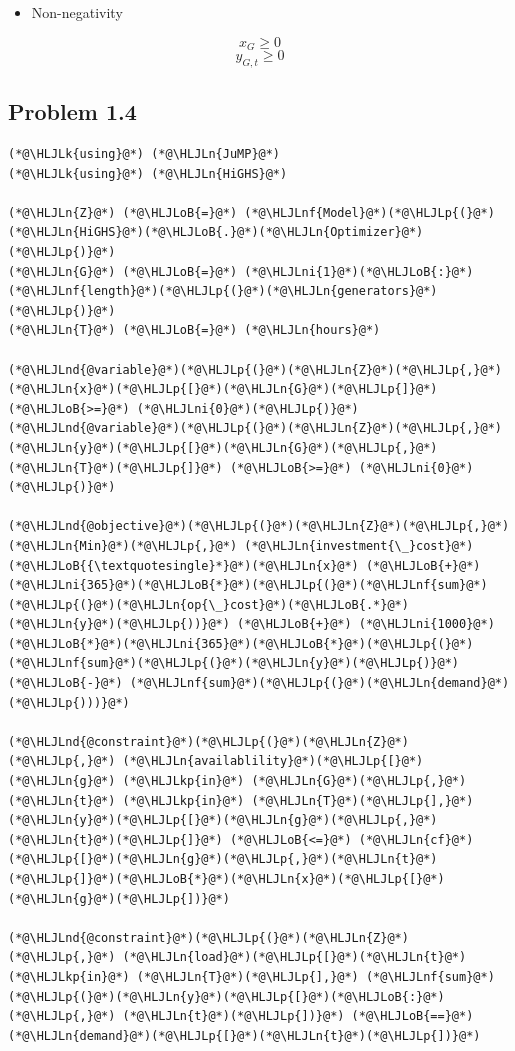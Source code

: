 \documentclass[12pt,a4paper]{article}
\newcommand{\HLJLk}[1]{\textcolor[RGB]{148,91,176}{\textbf{#1}}}
\newcommand{\HLJLkp}[1]{\textcolor[RGB]{148,91,176}{\textbf{#1}}}
\newcommand{\HLJLn}[1]{#1}
\newcommand{\HLJLnd}[1]{\textcolor[RGB]{214,102,97}{#1}}
\newcommand{\HLJLnf}[1]{\textcolor[RGB]{66,102,213}{#1}}
\newcommand{\HLJLni}[1]{\textcolor[RGB]{59,151,46}{#1}}
\newcommand{\HLJLoB}[1]{\textcolor[RGB]{102,102,102}{\textbf{#1}}}
\newcommand{\HLJLp}[1]{#1}
\begin{document}
\begin{itemize}
\item Non-negativity

\end{itemize}
\[
x_G \ge 0
\]
\[
y_{G,t} \ge 0
\]
\subsection{Problem 1.4}

\begin{lstlisting}
(*@\HLJLk{using}@*) (*@\HLJLn{JuMP}@*)
(*@\HLJLk{using}@*) (*@\HLJLn{HiGHS}@*)

(*@\HLJLn{Z}@*) (*@\HLJLoB{=}@*) (*@\HLJLnf{Model}@*)(*@\HLJLp{(}@*)(*@\HLJLn{HiGHS}@*)(*@\HLJLoB{.}@*)(*@\HLJLn{Optimizer}@*)(*@\HLJLp{)}@*)
(*@\HLJLn{G}@*) (*@\HLJLoB{=}@*) (*@\HLJLni{1}@*)(*@\HLJLoB{:}@*)(*@\HLJLnf{length}@*)(*@\HLJLp{(}@*)(*@\HLJLn{generators}@*)(*@\HLJLp{)}@*)
(*@\HLJLn{T}@*) (*@\HLJLoB{=}@*) (*@\HLJLn{hours}@*)

(*@\HLJLnd{@variable}@*)(*@\HLJLp{(}@*)(*@\HLJLn{Z}@*)(*@\HLJLp{,}@*) (*@\HLJLn{x}@*)(*@\HLJLp{[}@*)(*@\HLJLn{G}@*)(*@\HLJLp{]}@*) (*@\HLJLoB{>=}@*) (*@\HLJLni{0}@*)(*@\HLJLp{)}@*)
(*@\HLJLnd{@variable}@*)(*@\HLJLp{(}@*)(*@\HLJLn{Z}@*)(*@\HLJLp{,}@*) (*@\HLJLn{y}@*)(*@\HLJLp{[}@*)(*@\HLJLn{G}@*)(*@\HLJLp{,}@*) (*@\HLJLn{T}@*)(*@\HLJLp{]}@*) (*@\HLJLoB{>=}@*) (*@\HLJLni{0}@*)(*@\HLJLp{)}@*)

(*@\HLJLnd{@objective}@*)(*@\HLJLp{(}@*)(*@\HLJLn{Z}@*)(*@\HLJLp{,}@*) (*@\HLJLn{Min}@*)(*@\HLJLp{,}@*) (*@\HLJLn{investment{\_}cost}@*)(*@\HLJLoB{{\textquotesingle}*}@*)(*@\HLJLn{x}@*) (*@\HLJLoB{+}@*) (*@\HLJLni{365}@*)(*@\HLJLoB{*}@*)(*@\HLJLp{(}@*)(*@\HLJLnf{sum}@*)(*@\HLJLp{(}@*)(*@\HLJLn{op{\_}cost}@*)(*@\HLJLoB{.*}@*)(*@\HLJLn{y}@*)(*@\HLJLp{))}@*) (*@\HLJLoB{+}@*) (*@\HLJLni{1000}@*)(*@\HLJLoB{*}@*)(*@\HLJLni{365}@*)(*@\HLJLoB{*}@*)(*@\HLJLp{(}@*)(*@\HLJLnf{sum}@*)(*@\HLJLp{(}@*)(*@\HLJLn{y}@*)(*@\HLJLp{)}@*) (*@\HLJLoB{-}@*) (*@\HLJLnf{sum}@*)(*@\HLJLp{(}@*)(*@\HLJLn{demand}@*)(*@\HLJLp{)))}@*)

(*@\HLJLnd{@constraint}@*)(*@\HLJLp{(}@*)(*@\HLJLn{Z}@*)(*@\HLJLp{,}@*) (*@\HLJLn{availablility}@*)(*@\HLJLp{[}@*)(*@\HLJLn{g}@*) (*@\HLJLkp{in}@*) (*@\HLJLn{G}@*)(*@\HLJLp{,}@*) (*@\HLJLn{t}@*) (*@\HLJLkp{in}@*) (*@\HLJLn{T}@*)(*@\HLJLp{],}@*) (*@\HLJLn{y}@*)(*@\HLJLp{[}@*)(*@\HLJLn{g}@*)(*@\HLJLp{,}@*)(*@\HLJLn{t}@*)(*@\HLJLp{]}@*) (*@\HLJLoB{<=}@*) (*@\HLJLn{cf}@*)(*@\HLJLp{[}@*)(*@\HLJLn{g}@*)(*@\HLJLp{,}@*)(*@\HLJLn{t}@*)(*@\HLJLp{]}@*)(*@\HLJLoB{*}@*)(*@\HLJLn{x}@*)(*@\HLJLp{[}@*)(*@\HLJLn{g}@*)(*@\HLJLp{])}@*)

(*@\HLJLnd{@constraint}@*)(*@\HLJLp{(}@*)(*@\HLJLn{Z}@*)(*@\HLJLp{,}@*) (*@\HLJLn{load}@*)(*@\HLJLp{[}@*)(*@\HLJLn{t}@*) (*@\HLJLkp{in}@*) (*@\HLJLn{T}@*)(*@\HLJLp{],}@*) (*@\HLJLnf{sum}@*)(*@\HLJLp{(}@*)(*@\HLJLn{y}@*)(*@\HLJLp{[}@*)(*@\HLJLoB{:}@*)(*@\HLJLp{,}@*) (*@\HLJLn{t}@*)(*@\HLJLp{])}@*) (*@\HLJLoB{==}@*) (*@\HLJLn{demand}@*)(*@\HLJLp{[}@*)(*@\HLJLn{t}@*)(*@\HLJLp{])}@*)
\end{lstlisting}
\end{document}
